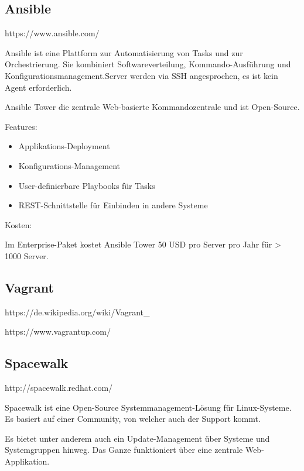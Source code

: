 
\subsection{Ansible}

https://www.ansible.com/

Ansible ist eine Plattform zur Automatisierung von Tasks und zur Orchestrierung. Sie kombiniert Softwareverteilung, Kommando-Ausführung und Konfigurationsmanagement.Server werden via SSH angesprochen, es ist kein Agent erforderlich.

Ansible Tower die zentrale Web-basierte Kommandozentrale und ist Open-Source.


Features:
\begin{itemize}
\item Applikations-Deployment
\item Konfigurations-Management
\item User-definierbare Playbooks für Tasks
\item REST-Schnittstelle für Einbinden in andere Systeme
\end{itemize}

Kosten:

Im Enterprise-Paket kostet Ansible Tower 50 USD pro Server pro Jahr für > 1000 Server.


\subsection{Vagrant}

https://de.wikipedia.org/wiki/Vagrant_%

https://www.vagrantup.com/



\subsection{Spacewalk}

http://spacewalk.redhat.com/

Spacewalk ist eine Open-Source Systemmanagement-Lösung für Linux-Systeme. Es basiert auf einer Community, von welcher auch der Support kommt.

Es bietet unter anderem auch ein Update-Management über Systeme und Systemgruppen hinweg. Das Ganze funktioniert über eine zentrale Web-Applikation.


